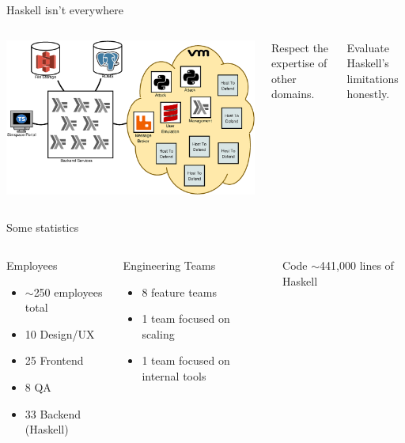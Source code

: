 \documentclass[aspectratio=169,ignorenonframetext]{beamer}
\begin{document}
\begin{frame}{Haskell isn't everywhere}
	\begin{columns}
		\includegraphics[width=\textwidth]{images/portal.eps}
		\begin{exampleblock}{}
			Respect the expertise of other domains.
		\end{exampleblock}
		\begin{exampleblock}{}
			Evaluate Haskell's limitations honestly.
		\end{exampleblock}
	\end{columns}
\end{frame}

\begin{frame}{Some statistics}
	\begin{columns}
		\column{.5\textwidth}
		\begin{block}{Employees}
			\begin{itemize}
				\item $\sim$250 employees total
				\item 10 Design/UX
				\item 25 Frontend
				\item 8 QA
				\item 33 Backend (Haskell)
			\end{itemize}
		\end{block}
		\column{.5\textwidth}
		\begin{block}{Engineering Teams}
			\begin{itemize}
				\item 8 feature teams
				\item 1 team focused on scaling
				\item 1 team focused on internal tools
			\end{itemize}
		\end{block}
		\begin{block}{Code}
			$\sim$441,000 lines of Haskell
		\end{block}
	\end{columns}
\end{frame}
\end{document}
